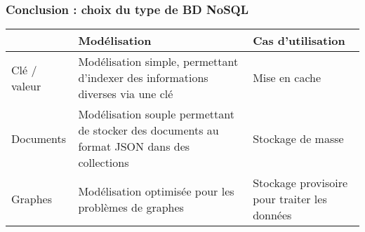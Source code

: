 	\begin{frame}
		\frametitle{Conclusion : choix du type de BD NoSQL}

		\begin{tabular}{|p{}|p{}|p{}|}
			\hline
			& Modélisation & Cas d'utilisation \\\hline
			Clé / valeur
			& Modélisation simple, permettant d'indexer des informations diverses via une clé
			& Mise en cache  \\\hline
			Documents
			& Modélisation souple permettant de stocker des documents au format JSON dans des collections
			& Stockage de masse \\\hline
			Graphes
			& Modélisation optimisée pour les problèmes de graphes
			& Stockage provisoire pour traiter les données \\\hline
		\end{tabular}
	\end{frame}